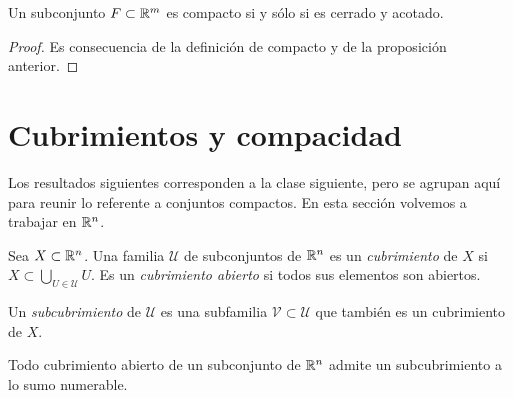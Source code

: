 \begin{corollary}
  Un subconjunto \(F \subset \mathbb{R}^m\) es compacto si y sólo si es cerrado y acotado.
\end{corollary}

\begin{proof}
  Es consecuencia de la definición de compacto y de la proposición anterior.
\end{proof}

\section{Cubrimientos y compacidad}

Los resultados siguientes corresponden a la clase siguiente, pero se agrupan aquí para reunir lo referente a conjuntos compactos. En esta sección volvemos a trabajar en \(\mathbb{R}^n\).

\begin{definition}[Cubrimiento]
  Sea \(X \subset \mathbb{R}^n\). Una familia \(\mathscr{U}\) de subconjuntos de \(\mathbb{R}^n\) es un \emph{cubrimiento} de \(X\) si \(X \subset \bigcup_{U \in \mathscr{U}} U\). Es un \emph{cubrimiento abierto} si todos sus elementos son abiertos.
\end{definition}

\begin{definition}[Subcubrimiento]
  Un \emph{subcubrimiento} de \(\mathscr{U}\) es una subfamilia \(\mathscr{V} \subset \mathscr{U}\) que también es un cubrimiento de \(X\).
\end{definition}

\begin{theorem}[Lindelöf]
  Todo cubrimiento abierto de un subconjunto de \(\mathbb{R}^n\) admite un subcubrimiento a lo sumo numerable.
\end{theorem}

